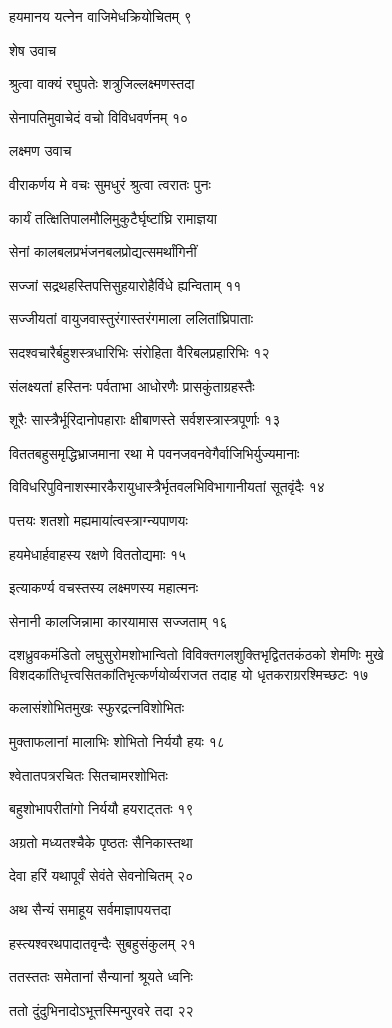 हयमानय यत्नेन वाजिमेधक्रियोचितम् ९

शेष उवाच

श्रुत्वा वाक्यं रघुपतेः शत्रुजिल्लक्ष्मणस्तदा

सेनापतिमुवाचेदं वचो विविधवर्णनम् १०

लक्ष्मण उवाच

वीराकर्णय मे वचः सुमधुरं श्रुत्वा त्वरातः पुनः

कार्यं तत्क्षितिपालमौलिमुकुटैर्घृष्टांघ्रि रामाज्ञया

सेनां कालबलप्रभंजनबलप्रोद्यत्समर्थांगिनीं

सज्जां सद्रथहस्तिपत्तिसुहयारोहैर्विधे ह्यन्विताम् ११

सज्जीयतां वायुजवास्तुरंगास्तरंगमाला ललितांघ्रिपाताः

सदश्वचारैर्बहुशस्त्रधारिभिः संरोहिता वैरिबलप्रहारिभिः १२

संलक्ष्यतां हस्तिनः पर्वताभा आधोरणैः प्रासकुंताग्रहस्तैः

शूरैः सास्त्रैर्भूरिदानोपहाराः क्षीबाणस्ते सर्वशस्त्रास्त्रपूर्णाः १३

विततबहुसमृद्धिभ्राजमाना रथा मे पवनजवनवेगैर्वाजिभिर्युज्यमानाः

विविधरिपुविनाशस्मारकैरायुधास्त्रैर्भृतवलभिविभागानीयतां सूतवृंदैः १४

पत्तयः शतशो मह्यमायांत्वस्त्राग्न्यपाणयः

हयमेधार्हवाहस्य रक्षणे विततोद्यमाः १५

इत्याकर्ण्य वचस्तस्य लक्ष्मणस्य महात्मनः

सेनानी कालजिन्नामा कारयामास सज्जताम् १६

दशध्रुवकमंडितो लघुसुरोमशोभान्वितो विविक्तगलशुक्तिभृद्विततकंठको शेमणिः मुखे
विशदकांतिधृत्त्वसितकांतिभृत्कर्णयोर्व्यराजत तदाह यो धृतकराग्ररश्मिच्छटः १७

कलासंशोभितमुखः स्फुरद्रत्नविशोभितः

मुक्ताफलानां मालाभिः शोभितो निर्ययौ हयः १८

श्वेतातपत्ररचितः सितचामरशोभितः

बहुशोभापरीतांगो निर्ययौ हयराट्ततः १९

अग्रतो मध्यतश्चैके पृष्ठतः सैनिकास्तथा

देवा हरिं यथापूर्वं सेवंते सेवनोचितम् २०

अथ सैन्यं समाहूय सर्वमाज्ञापयत्तदा

हस्त्यश्वरथपादातवृन्दैः सुबहुसंकुलम् २१

ततस्ततः समेतानां सैन्यानां श्रूयते ध्वनिः

ततो दुंदुभिनादोऽभूत्तस्मिन्पुरवरे तदा २२

